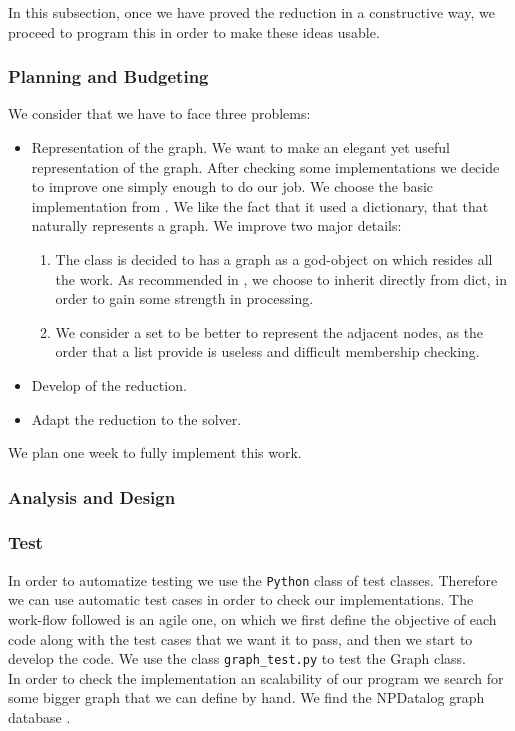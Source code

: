In this subsection, once we have proved the reduction in a constructive way, we proceed to program this in order to make these ideas usable.

\subsubsection{Planning and Budgeting}

We consider that we have to face three problems:
\begin{itemize}
\item Representation of the graph. We want to make an elegant yet useful representation of the graph. After checking some implementations we decide to improve one simply enough to do our job. We choose the basic implementation from \cite{graphAdvanced}. We like the fact that it used a dictionary, that that naturally represents a graph. We improve two major details:
  \begin{enumerate}
  \item The class is decided to has a graph as a god-object on which resides all the work. As recommended in \cite{slatkin2019effective}, we choose to inherit directly from dict, in order to gain some strength in processing.
  \item We consider a set to be better to represent the adjacent nodes, as the order that a list provide is useless and difficult membership checking.
  \end{enumerate}

\item Develop of the reduction.
\item Adapt the reduction to the solver.

\end{itemize}


We plan one week to fully implement this work. 

\subsubsection{Analysis and Design}






\subsubsection{Test}

In order to automatize testing we use the \texttt{Python} class of test classes. Therefore we can use automatic test cases in order to check our implementations. The work-flow followed is an agile one, on which we first define the objective of each code along with the test cases that we want it to pass, and then we start to develop the code. 
We use the class \texttt{graph\_test.py} to test the Graph class. \\

In order to check the implementation an scalability of our program we search for some bigger graph that we can define by hand. We find the NPDatalog graph database \cite{NPDatalog}.